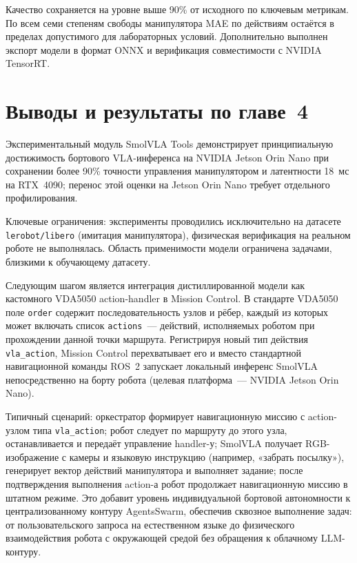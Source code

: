 \documentclass[14pt,a4paper]{extreport}
\begin{document}
Качество сохраняется на уровне выше 90\% от исходного по ключевым метрикам. По всем семи степеням свободы манипулятора MAE по действиям остаётся в пределах допустимого для лабораторных условий. Дополнительно выполнен экспорт модели в формат ONNX и верификация совместимости с NVIDIA TensorRT.

\section{Выводы и результаты по главе~4}

Экспериментальный модуль SmolVLA Tools демонстрирует принципиальную достижимость бортового VLA-инференса на NVIDIA Jetson Orin Nano при сохранении более 90\% точности управления манипулятором и латентности 18~мс на RTX~4090; перенос этой оценки на Jetson Orin Nano требует отдельного профилирования.

Ключевые ограничения: эксперименты проводились исключительно на датасете \texttt{lerobot/libero} (имитация манипулятора), физическая верификация на реальном роботе не выполнялась. Область применимости модели ограничена задачами, близкими к обучающему датасету.

Следующим шагом является интеграция дистиллированной модели как кастомного VDA5050 action-handler в Mission Control. В стандарте VDA5050 поле \texttt{order} содержит последовательность узлов и рёбер, каждый из которых может включать список \texttt{actions}~--- действий, исполняемых роботом при прохождении данной точки маршрута. Регистрируя новый тип действия \texttt{vla\_action}, Mission Control перехватывает его и вместо стандартной навигационной команды ROS~2 запускает локальный инференс SmolVLA непосредственно на борту робота (целевая платформа~--- NVIDIA Jetson Orin Nano).

Типичный сценарий: оркестратор формирует навигационную миссию с action-узлом типа \texttt{vla\_action}; робот следует по маршруту до этого узла, останавливается и передаёт управление handler-у; SmolVLA получает RGB-изображение с камеры и языковую инструкцию (например, «забрать посылку»), генерирует вектор действий манипулятора и выполняет задание; после подтверждения выполнения action-а робот продолжает навигационную миссию в штатном режиме. Это добавит уровень индивидуальной бортовой автономности к централизованному контуру AgentsSwarm, обеспечив сквозное выполнение задач: от пользовательского запроса на естественном языке до физического взаимодействия робота с окружающей средой без обращения к облачному LLM-контуру.
\end{document}
